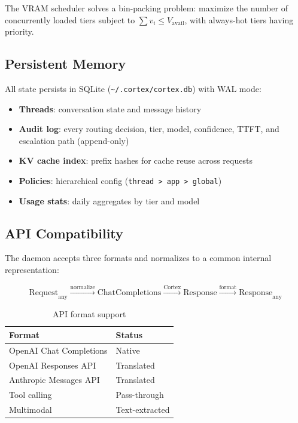 \documentclass[11pt, a4paper, twocolumn]{article}
\begin{document}
The VRAM scheduler solves a bin-packing problem: maximize the number of concurrently loaded tiers subject to $\sum v_i \leq V_{\text{avail}}$, with always-hot tiers having priority.

\subsection{Persistent Memory}

All state persists in SQLite (\texttt{\textasciitilde/.cortex/cortex.db}) with WAL mode:

\begin{itemize}[nosep, leftmargin=*]
    \item \textbf{Threads}: conversation state and message history
    \item \textbf{Audit log}: every routing decision, tier, model, confidence, TTFT, and escalation path (append-only)
    \item \textbf{KV cache index}: prefix hashes for cache reuse across requests
    \item \textbf{Policies}: hierarchical config (\texttt{thread > app > global})
    \item \textbf{Usage stats}: daily aggregates by tier and model
\end{itemize}

\subsection{API Compatibility}

The daemon accepts three formats and normalizes to a common internal representation:

\begin{equation*}
    \text{Request}_{\text{any}} \xrightarrow{\text{normalize}} \text{ChatCompletions} \xrightarrow{\text{Cortex}} \text{Response} \xrightarrow{\text{format}} \text{Response}_{\text{any}}
\end{equation*}

\begin{table}[H]
\centering
\caption{API format support}
\small
\begin{tabular}{@{}ll@{}}
\toprule
Format & Status \\
\midrule
OpenAI Chat Completions & Native \\
OpenAI Responses API & Translated \\
Anthropic Messages API & Translated \\
Tool calling & Pass-through \\
Multimodal & Text-extracted \\
\bottomrule
\end{tabular}
\end{table}
\end{document}
